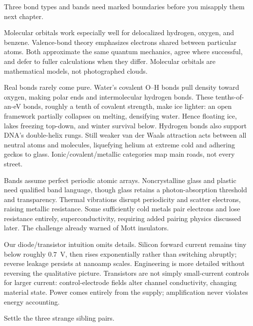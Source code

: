 
Three bond types and bands need marked boundaries before you misapply them next chapter.

Molecular orbitals work especially well for delocalized hydrogen, oxygen, and benzene. Valence-bond theory emphasizes electrons shared between particular atoms. Both approximate the same quantum mechanics, agree where successful, and defer to fuller calculations when they differ. Molecular orbitals are mathematical models, not photographed clouds.

Real bonds rarely come pure. Water's covalent O--H bonds pull density toward oxygen, making polar ends and intermolecular hydrogen bonds. These tenths-of-an-eV bonds, roughly a tenth of covalent strength, make ice lighter: an open framework partially collapses on melting, densifying water. Hence floating ice, lakes freezing top-down, and winter survival below. Hydrogen bonds also support DNA's double-helix rungs. Still weaker van der Waals attraction acts between all neutral atoms and molecules, liquefying helium at extreme cold and adhering geckos to glass. Ionic/covalent/metallic categories map main roads, not every street.

Bands assume perfect periodic atomic arrays. Noncrystalline glass and plastic need qualified band language, though glass retains a photon-absorption threshold and transparency. Thermal vibrations disrupt periodicity and scatter electrons, raising metallic resistance. Some sufficiently cold metals pair electrons and lose resistance entirely, superconductivity, requiring added pairing physics discussed later. The challenge already warned of Mott insulators.

Our diode/transistor intuition omits details. Silicon forward current remains tiny below roughly \(0.7\)~V, then rises exponentially rather than switching abruptly; reverse leakage persists at nanoamp scales. Engineering is more detailed without reversing the qualitative picture. Transistors are not simply small-current controls for larger current: control-electrode fields alter channel conductivity, changing material state. Power comes entirely from the supply; amplification never violates energy accounting.


Settle the three strange sibling pairs.

